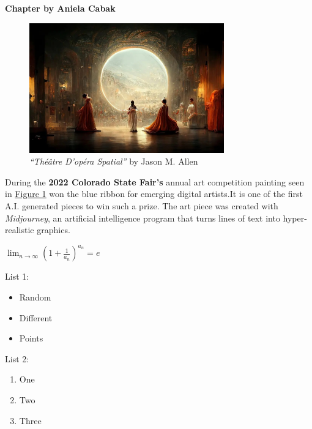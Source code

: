 \newpage
\Section \centering \textbf{Chapter  by Aniela Cabak}
\label{sec:aniela}

\begin{figure}[h]
    \centering
    \includegraphics[width=0.75\textwidth]{Pictures/art.jpg}
    \caption{ \textit{“Théâtre D’opéra Spatial”} by Jason M. Allen}
    \label{fig:art}
\end{figure}

\bigskip

During the \textbf{2022 Colorado State Fair’s} annual art competition painting seen in \underline {Figure \ref{fig:art}} won the blue ribbon for emerging digital artists.It is one of the first A.I. generated pieces to win such a prize. The art piece was created with \textit{Midjourney}, an artificial intelligence program that turns lines of text into hyper-realistic graphics.


\bigskip
\bigskip

\begin{math}
\lim_{n \to \infty} (1 + \frac{1}{a_n})^{a_n} = e
\end{math}

\bigskip
\bigskip


\newpage
List 1:
\begin{itemize}
  \item Random
  \item Different
  \item Points
\end{itemize}

List 2:
\begin{enumerate}
  \item One
  \item Two
  \item Three
\end{enumerate}






